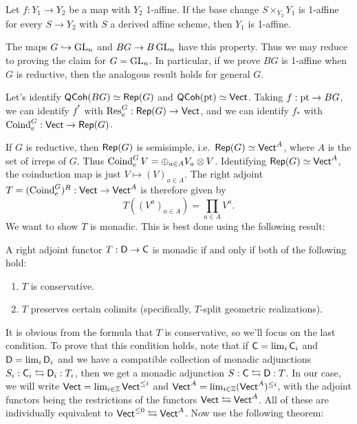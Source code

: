 \documentclass{article}
\begin{document}
\begin{prop}[3.2.7 in Gaitsgory]
	Let $f: Y_1 \to Y_2$ be a map with $Y_2$ 1-affine.
	If the base change $S \times_{Y_2} Y_1$ is 1-affine for every $S \to Y_2$ with $S$ a derived affine scheme, then $Y_1$ is 1-affine.
\end{prop}

The maps $G \hookrightarrow \operatorname{GL}_n$ and $BG \to B\operatorname{GL}_n$ have this property.
Thus we may reduce to proving the claim for $G = \operatorname{GL}_n$.
In particular, if we prove $BG$ is 1-affine when $G$ is reductive, then the analogous result holds for general $G$.

Let's identify $\mathsf{QCoh}(BG) \simeq \mathsf{Rep}(G)$ and $\mathsf{QCoh}(\operatorname{pt}) \simeq \mathsf{Vect}$.
Taking $f: \operatorname{pt} \to BG$, we can identify $f^*$ with $\operatorname{Res}_e^G: \mathsf{Rep}(G) \to \mathsf{Vect}$, and we can identify $f_*$ with $\operatorname{Coind}_e^G: \mathsf{Vect} \to \mathsf{Rep}(G)$.

If $G$ is reductive, then $\mathsf{Rep}(G)$ is semisimple, i.e.\ $\mathsf{Rep}(G) \simeq \mathsf{Vect}^A$, where $A$ is the set of irreps of $G$.
Thus $\operatorname{Coind}_e^G V = \oplus_{a \in A} V_a \otimes V$.
Identifying $\mathsf{Rep}(G) \simeq \mathsf{Vect}^A$, the coinduction map is just $V \mapsto (V)_{a \in A}$.
The right adjoint $T = (\operatorname{Coind}_e^G)^R : \mathsf{Vect} \to \mathsf{Vect}^A$ is therefore given by
\[
	T((V^a)_{a \in A}) = \prod_{a \in A} V^a.
\]
We want to show $T$ is monadic.
This is best done using the following result:

\begin{thm}
	A right adjoint functor $T: \mathsf{D} \to \mathsf{C}$ is monadic if and only if both of the following hold:
	\begin{enumerate}
		\item $T$ is conservative.
		\item $T$ preserves certain colimits (specifically, $T$-split geometric realizations).
	\end{enumerate}
\end{thm}

It is obvious from the formula that $T$ is conservative, so we'll focus on the last condition.
To prove that this condition holds, note that if $\mathsf{C} = \lim_i \mathsf{C}_i$ and $\mathsf{D} = \lim_i \mathsf{D}_i$ and we have a compatible collection of monadic adjunctions $S_i: \mathsf{C}_i \leftrightarrows \mathsf{D}_i: T_i$, then we get a monadic adjunction $S: \mathsf{C} \leftrightarrows \mathsf{D}: T$.
In our case, we will write $\mathsf{Vect} = \lim_{i \in \mathbb{Z}} \mathsf{Vect}^{\leq i}$ and $\mathsf{Vect}^A = \lim_{i \in \mathbb{Z}} (\mathsf{Vect}^A)^{\leq i}$, with the adjoint functors being the restrictions of the functors $\mathsf{Vect} \leftrightarrows \mathsf{Vect}^A$.
All of these are individually equivalent to $\mathsf{Vect}^{\leq 0} \leftrightarrows \mathsf{Vect}^A$.
Now use the following theorem:
\end{document}

